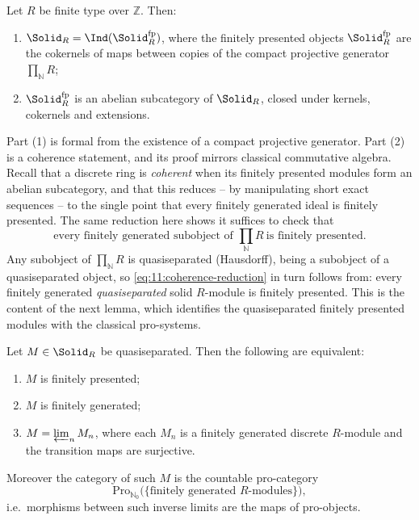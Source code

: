 \begin{theorem}[Coherence]
\label{thm:11:coherence}
Let $R$ be finite type over $\mathbb{Z}$. Then:
\begin{enumerate}
\item $\Solid_{R}=\Ind(\Solid_{R}^{\mathrm{fp}})$, where the finitely
presented objects $\Solid_{R}^{\mathrm{fp}}$ are the cokernels of maps between
copies of the compact projective generator $\prod_{\mathbb{N}}R$;
\item $\Solid_{R}^{\mathrm{fp}}$ is an abelian subcategory of $\Solid_{R}$,
closed under kernels, cokernels and extensions.
\end{enumerate}
\end{theorem}

Part (1) is formal from the existence of a compact projective generator. Part
(2) is a coherence statement, and its proof mirrors classical commutative
algebra. Recall that a discrete ring is \emph{coherent} when its finitely
presented modules form an abelian subcategory, and that this reduces -- by
manipulating short exact sequences -- to the single point that every finitely
generated ideal is finitely presented. The same reduction here shows it
suffices to check that
\begin{equation}
\label{eq:11:coherence-reduction}
\text{every finitely generated subobject of }\textstyle\prod_{\mathbb{N}}R\
\text{is finitely presented.}
\end{equation}
Any subobject of $\prod_{\mathbb{N}}R$ is quasiseparated (Hausdorff), being a
subobject of a quasiseparated object, so \eqref{eq:11:coherence-reduction} in
turn follows from: every finitely generated \emph{quasiseparated} solid
$R$-module is finitely presented. This is the content of the next lemma, which
identifies the quasiseparated finitely presented modules with the classical
pro-systems.

\begin{lemma}[Quasiseparated finitely presented $=$ pro-(f.g.\ modules)]
\label{lem:11:qsep-pro}
Let $M\in\Solid_{R}$ be quasiseparated. Then the following are equivalent:
\begin{enumerate}
\item $M$ is finitely presented;
\item $M$ is finitely generated;
\item $M=\varprojlim_{n}M_{n}$, where each $M_{n}$ is a finitely generated
discrete $R$-module and the transition maps are surjective.
\end{enumerate}
Moreover the category of such $M$ is the countable pro-category
\begin{equation*}
\mathrm{Pro}_{\mathbb{N}_{0}}\bigl(\{\text{finitely generated }R\text{-modules}
\}\bigr),
\end{equation*}
i.e.\ morphisms between such inverse limits are the maps of pro-objects.
\end{lemma}

